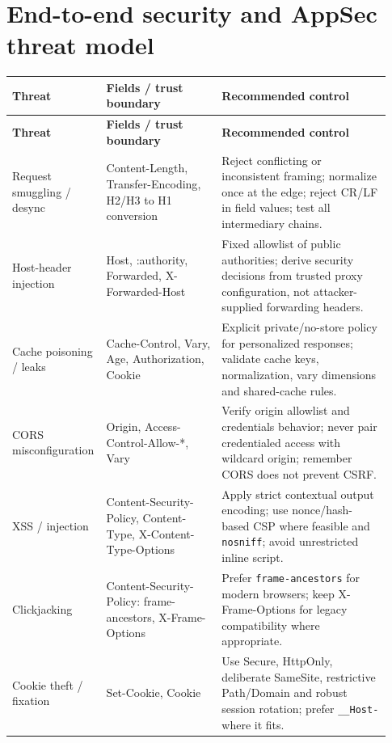 \documentclass[10pt,letterpaper,oneside]{article}
\newcommand{\field}[1]{{\ttfamily\small\color{Deep}#1}}
\begin{document}
\section{End-to-end security and AppSec threat model}
\begin{longtable}{>{\RaggedRight\arraybackslash}p{0.19\linewidth}>{\RaggedRight\arraybackslash}p{0.30\linewidth}>{\RaggedRight\arraybackslash}p{0.44\linewidth}}
\toprule\rowcolor{Navy}\color{white}\sffamily\bfseries Threat & \color{white}\sffamily\bfseries Fields / trust boundary & \color{white}\sffamily\bfseries Recommended control\\\midrule\endfirsthead
\toprule\rowcolor{Navy}\color{white}\sffamily\bfseries Threat & \color{white}\sffamily\bfseries Fields / trust boundary & \color{white}\sffamily\bfseries Recommended control\\\midrule\endhead
Request smuggling / desync & \field{Content-Length}, \field{Transfer-Encoding}, H2/H3 to H1 conversion & Reject conflicting or inconsistent framing; normalize once at the edge; reject CR/LF in field values; test all intermediary chains.\\\midrule
Host-header injection & \field{Host}, \field{:authority}, \field{Forwarded}, \field{X-Forwarded-Host} & Fixed allowlist of public authorities; derive security decisions from trusted proxy configuration, not attacker-supplied forwarding headers.\\\midrule
Cache poisoning / leaks & \field{Cache-Control}, \field{Vary}, \field{Age}, \field{Authorization}, \field{Cookie} & Explicit private/no-store policy for personalized responses; validate cache keys, normalization, vary dimensions and shared-cache rules.\\\midrule
CORS misconfiguration & \field{Origin}, \field{Access-Control-Allow-*}, \field{Vary} & Verify origin allowlist and credentials behavior; never pair credentialed access with wildcard origin; remember CORS does not prevent CSRF.\\\midrule
XSS / injection & \field{Content-Security-Policy}, \field{Content-Type}, \field{X-Content-Type-Options} & Apply strict contextual output encoding; use nonce/hash-based CSP where feasible and \texttt{nosniff}; avoid unrestricted inline script.\\\midrule
Clickjacking & \field{Content-Security-Policy: frame-ancestors}, \field{X-Frame-Options} & Prefer \texttt{frame-ancestors} for modern browsers; keep X-Frame-Options for legacy compatibility where appropriate.\\\midrule
Cookie theft / fixation & \field{Set-Cookie}, \field{Cookie} & Use Secure, HttpOnly, deliberate SameSite, restrictive Path/Domain and robust session rotation; prefer \texttt{\_\_Host-} where it fits.\\\midrule

\end{longtable}
\end{document}
